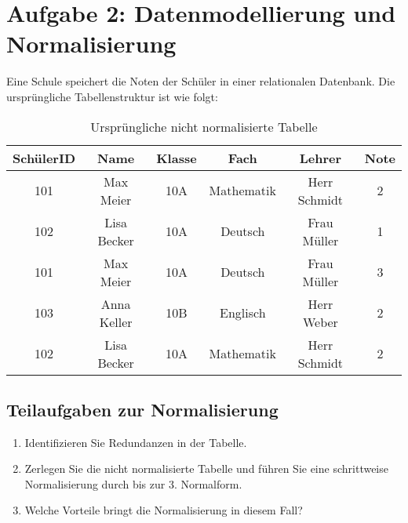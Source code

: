 \documentclass[a4paper,12pt]{article}
\begin{document}
	\section*{Aufgabe 2: Datenmodellierung und Normalisierung}
	
Eine Schule speichert die Noten der Schüler in einer relationalen Datenbank. Die ursprüngliche Tabellenstruktur ist wie folgt:

\begin{table}[h]
	\centering
	\caption{Ursprüngliche nicht normalisierte Tabelle}
	\begin{tabular}{|c|c|c|c|c|c|}
		\hline
		SchülerID & Name & Klasse & Fach & Lehrer & Note \\
		\hline
		101 & Max Meier & 10A & Mathematik & Herr Schmidt & 2 \\
		102 & Lisa Becker & 10A & Deutsch & Frau Müller & 1 \\
		101 & Max Meier & 10A & Deutsch & Frau Müller & 3 \\
		103 & Anna Keller & 10B & Englisch & Herr Weber & 2 \\
		102 & Lisa Becker & 10A & Mathematik & Herr Schmidt & 2 \\
		\hline
	\end{tabular}
\end{table}

\subsection*{Teilaufgaben zur Normalisierung}
\begin{enumerate}
	\item Identifizieren Sie Redundanzen in der Tabelle.
	\item Zerlegen Sie die nicht normalisierte Tabelle und führen Sie eine schrittweise Normalisierung durch bis zur 3. Normalform.
	\item Welche Vorteile bringt die Normalisierung in diesem Fall?
\end{enumerate}
	
\end{document}
